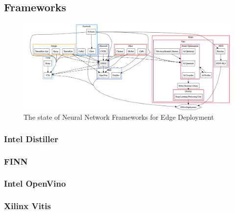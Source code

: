 \subsection{Frameworks}
\begin{figure}
\centering
\includegraphics[width=\textwidth]{Figures/diagram.png}
\caption[Neural Network Frameworks]{The state of Neural Network Frameworks for Edge Deployment}
\label{fig:Neural Network Frameworks}
\end{figure}


\subsubsection{Intel Distiller}
\subsubsection{FINN}
\subsubsection{Intel OpenVino}
\subsubsection{Xilinx Vitis}
